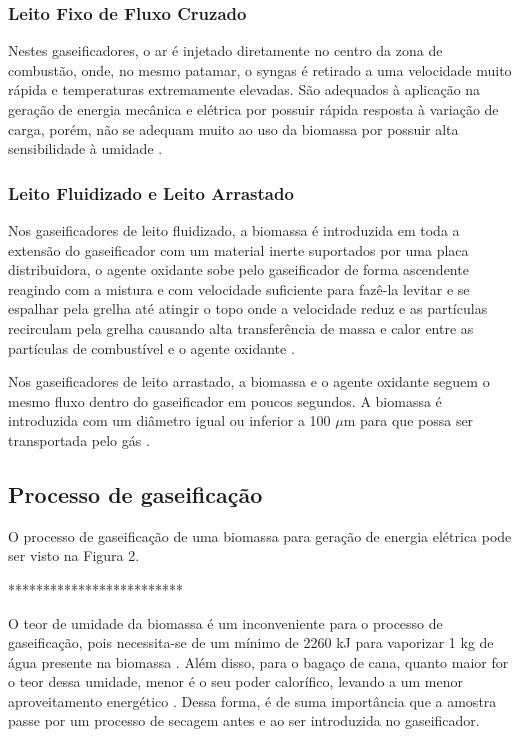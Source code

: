 \subsubsection{Leito Fixo de Fluxo Cruzado}

Nestes gaseificadores, o ar é injetado diretamente no centro da zona de combustão, onde, no mesmo patamar, o syngas é retirado a uma velocidade muito rápida e temperaturas extremamente elevadas. São adequados à aplicação na geração de energia mecânica e elétrica por possuir rápida resposta à variação de carga, porém, não se adequam muito ao uso da biomassa por possuir alta sensibilidade à umidade \cite{sanchez2010}.


\subsubsection{Leito Fluidizado e Leito Arrastado}

Nos gaseificadores de leito fluidizado, a biomassa é introduzida em toda a extensão do gaseificador com um material inerte suportados por uma placa distribuidora, o agente oxidante sobe pelo gaseificador de forma ascendente reagindo com a mistura \cite{sanchez2010}e com velocidade suficiente para fazê-la levitar e se espalhar pela grelha até atingir o topo onde a velocidade reduz e as partículas recirculam pela grelha causando alta transferência de massa e calor entre as partículas de combustível e o agente oxidante \cite{reed1988}. 

Nos gaseificadores de leito arrastado, a biomassa e o agente oxidante seguem o mesmo fluxo dentro do gaseificador em poucos segundos. A biomassa é introduzida com um diâmetro igual ou inferior a 100 $\mu$m para que possa ser transportada pelo gás \cite{higman2007}.


\subsection{Processo de gaseificação}

O processo de gaseificação de uma biomassa para geração de energia elétrica pode ser visto na Figura 2.

*************************

O teor de umidade da biomassa é um inconveniente para o processo de gaseificação, pois necessita-se de um mínimo de 2260 kJ para vaporizar 1 kg de água presente na biomassa \cite{basu2010}. Além disso, para o bagaço de cana, quanto maior for o teor dessa umidade, menor é o seu poder calorífico, levando a um menor aproveitamento energético \cite{silva2008}. Dessa forma, é de suma importância que a amostra passe por um processo de secagem antes e ao ser introduzida no gaseificador.

